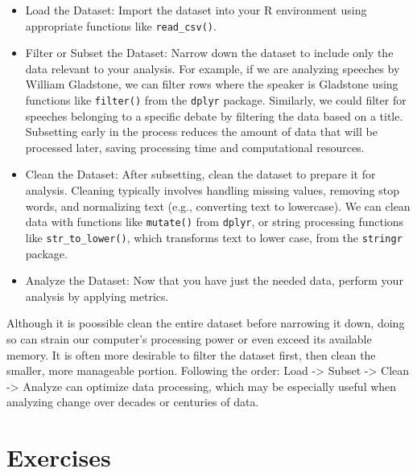 \documentclass[
]{article}
\begin{document}
\begin{itemize}
\item
  Load the Dataset: Import the dataset into your R environment using
  appropriate functions like \texttt{read\_csv()}.
\item
  Filter or Subset the Dataset: Narrow down the dataset to include only
  the data relevant to your analysis. For example, if we are analyzing
  speeches by William Gladstone, we can filter rows where the speaker is
  Gladstone using functions like \texttt{filter()} from the
  \texttt{dplyr} package. Similarly, we could filter for speeches
  belonging to a specific debate by filtering the data based on a title.
  Subsetting early in the process reduces the amount of data that will
  be processed later, saving processing time and computational
  resources.
\item
  Clean the Dataset: After subsetting, clean the dataset to prepare it
  for analysis. Cleaning typically involves handling missing values,
  removing stop words, and normalizing text (e.g., converting text to
  lowercase). We can clean data with functions like \texttt{mutate()}
  from \texttt{dplyr}, or string processing functions like
  \texttt{str\_to\_lower()}, which transforms text to lower case, from
  the \texttt{stringr} package.
\item
  Analyze the Dataset: Now that you have just the needed data, perform
  your analysis by applying metrics.
\end{itemize}

Although it is poossible clean the entire dataset before narrowing it
down, doing so can strain our computer's processing power or even exceed
its available memory. It is often more desirable to filter the dataset
first, then clean the smaller, more manageable portion. Following the
order: Load -\textgreater{} Subset -\textgreater{} Clean -\textgreater{}
Analyze can optimize data processing, which may be especially useful
when analyzing change over decades or centuries of data.

\section{Exercises}\label{exercises}
\end{document}
